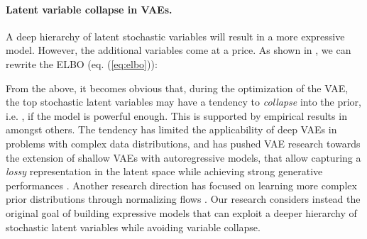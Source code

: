 \documentclass{article}
\begin{document}
\paragraph{Latent variable collapse in VAEs.}
A deep hierarchy of latent stochastic variables will result in a more expressive model. However, the additional variables come at a price. As shown in \citep{Chen2017,Maaloe17}, we can rewrite the ELBO (eq. (\ref{eq:elbo})):

From the above, it becomes obvious that, during the optimization of the VAE, the top stochastic latent variables may have a tendency to \textit{collapse} into the prior, i.e. , if the model  is powerful enough. This is supported by empirical results in \citep{Sonderby2016, Bowman2015} amongst others. The tendency has limited the applicability of deep VAEs in problems with complex data distributions, and has pushed VAE research towards the extension of shallow VAEs with autoregressive models, that allow capturing a \textit{lossy} representation in the latent space while achieving strong generative performances \citep{Gulrajani2016, Chen2017}. Another research direction has focused on learning more complex prior distributions through normalizing flows \citep{Rezende2015,Tomczak16, Kingma2016}. Our research considers instead the original goal of building expressive models that can exploit a deeper hierarchy of stochastic latent variables while avoiding variable collapse.
\end{document}
